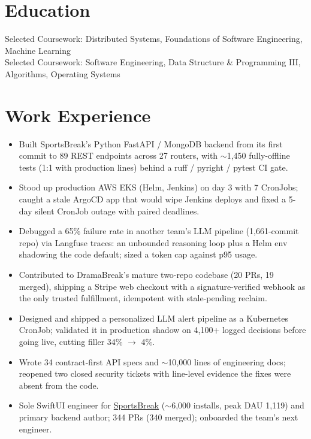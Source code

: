 \documentclass[11pt, letterpaper]{article}
\begin{document}

\section{Education}
Selected Coursework: Distributed Systems, Foundations of Software Engineering, Machine Learning\\[1pt]
Selected Coursework: Software Engineering, Data Structure \& Programming III, Algorithms, Operating Systems

\section{Work Experience}
\begin{itemize}
  \item Built SportsBreak's Python FastAPI / MongoDB backend from its first commit to 89 REST endpoints across 27 routers, with $\sim$1{,}450 fully-offline tests (1:1 with production lines) behind a ruff / pyright / pytest CI gate.
  \item Stood up production AWS EKS (Helm, Jenkins) on day 3 with 7 CronJobs; caught a stale ArgoCD app that would wipe Jenkins deploys and fixed a 5-day silent CronJob outage with paired deadlines.
  \item Debugged a 65\% failure rate in another team's LLM pipeline (1{,}661-commit repo) via Langfuse traces: an unbounded reasoning loop plus a Helm env shadowing the code default; sized a token cap against p95 usage.
  \item Contributed to DramaBreak's mature two-repo codebase (20 PRs, 19 merged), shipping a Stripe web checkout with a signature-verified webhook as the only trusted fulfillment, idempotent with stale-pending reclaim.
  \item Designed and shipped a personalized LLM alert pipeline as a Kubernetes CronJob; validated it in production shadow on 4{,}100+ logged decisions before going live, cutting filler 34\% $\to$ 4\%.
  \item Wrote 34 contract-first API specs and $\sim$10{,}000 lines of engineering docs; reopened two closed security tickets with line-level evidence the fixes were absent from the code.
  \item Sole SwiftUI engineer for \href{https://apps.apple.com/app/id6762649287}{SportsBreak} ($\sim$6{,}000 installs, peak DAU 1{,}119) and primary backend author; 344 PRs (340 merged); onboarded the team's next engineer.
\end{itemize}
\end{document}
